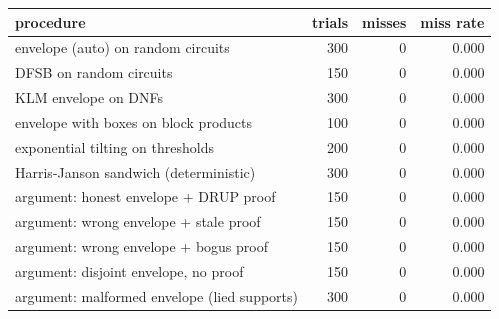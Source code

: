 \begin{tabular}{lrrr}
\toprule
procedure & trials & misses & miss rate\\
\midrule
envelope (auto) on random circuits & 300 & 0 & 0.000\\
DFSB on random circuits & 150 & 0 & 0.000\\
KLM envelope on DNFs & 300 & 0 & 0.000\\
envelope with boxes on block products & 100 & 0 & 0.000\\
exponential tilting on thresholds & 200 & 0 & 0.000\\
Harris-Janson sandwich (deterministic) & 300 & 0 & 0.000\\
argument: honest envelope + DRUP proof & 150 & 0 & 0.000\\
argument: wrong envelope + stale proof & 150 & 0 & 0.000\\
argument: wrong envelope + bogus proof & 150 & 0 & 0.000\\
argument: disjoint envelope, no proof & 150 & 0 & 0.000\\
argument: malformed envelope (lied supports) & 300 & 0 & 0.000\\
\bottomrule
\end{tabular}
